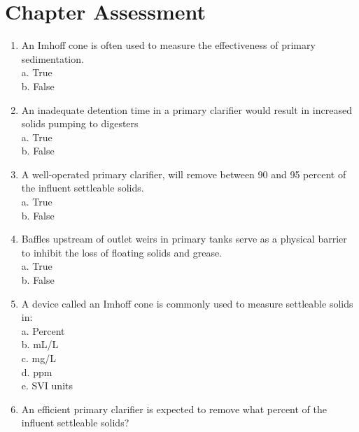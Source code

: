 \section*{Chapter Assessment}
\begin{tcolorbox}[breakable, enhanced,
colframe=blue!25,
colback=blue!10,
coltitle=blue!20!black,  
title= Chapter Assessment]

\begin{enumerate}


\item  An Imhoff cone is often used to measure the effectiveness of primary sedimentation. \\

a. True \\
b. False \\


\item  An inadequate detention time in a primary clarifier would result in increased solids pumping to digesters \\

a. True \\
b. False \\


\item  A well-operated primary clarifier, will remove between 90 and 95 percent of the influent settleable solids. \\

a. True \\
b. False \\


\item  Baffles upstream of outlet weirs in primary tanks serve as a physical barrier to inhibit the loss of floating solids and grease. \\

a. True \\
b. False \\

\item  A device called an Imhoff cone is commonly used to measure settleable solids in: \\

a. Percent \\
b. mL/L \\
c. mg/L \\
d. ppm \\
e. SVI units \\


\item  An efficient primary clarifier is expected to remove what percent of the influent settleable solids? \\


\end{enumerate}
\end{tcolorbox}
